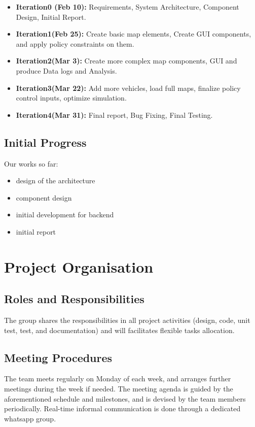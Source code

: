 \documentclass[11pt]{article}
\begin{document}
\begin{itemize}
\item
\textbf{Iteration0 (Feb 10):} Requirements, System Architecture, Component Design, Initial Report.
 \item \textbf{Iteration1(Feb 25):}  Create basic map elements, Create GUI components, and apply policy constraints on them.
 \item \textbf{Iteration2(Mar 3):} Create more complex map components, GUI and produce Data logs and Analysis.
 \item \textbf{Iteration3(Mar 22):} Add more vehicles, load full maps, finalize policy control inputs, optimize simulation.
 \item \textbf{Iteration4(Mar 31):} Final report, Bug Fixing, Final Testing.


\end{itemize}
	
\subsection{Initial Progress}
Our works so far:
\begin{itemize}
	\item design of the architecture
	\item component design
	\item initial development for backend
	\item initial report
\end{itemize}


\section{Project Organisation}

\subsection{Roles and Responsibilities}

The group shares the responsibilities in all project activities (design, code, unit test, test, and documentation) and will facilitates flexible tasks allocation. 

\subsection{Meeting Procedures}


The team meets regularly on Monday of each week, and arranges further meetings during the week if needed. The meeting agenda is guided by the aforementioned schedule and milestones, and is devised by the team members periodically. Real-time informal communication is done through a dedicated whatsapp group.
\end{document}
